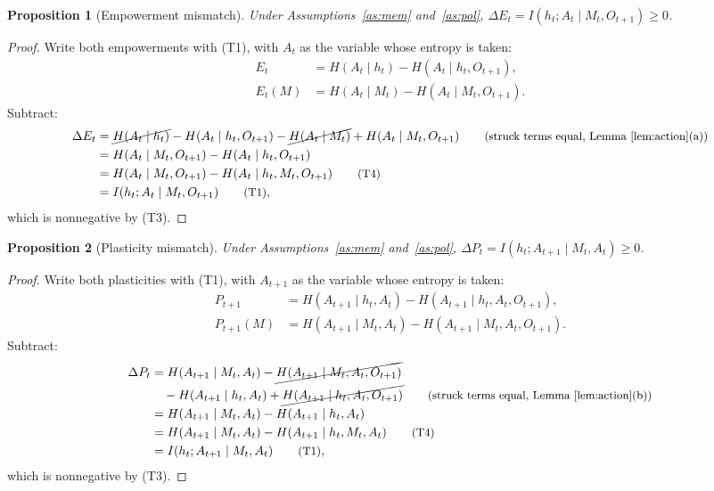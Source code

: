 \documentclass{article}
\newtheorem{proposition}{Proposition}[section]
\theoremstyle{definition}
\theoremstyle{remark}
\newcommand{\dE}{\Delta E}
\newcommand{\dP}{\Delta P}
\newcommand{\why}[1]{\tag*{\small(#1)}}
\begin{document}
\begin{proposition}[Empowerment mismatch]\label{prop:dE}
Under Assumptions~\ref{as:mem} and~\ref{as:pol}, $\dE_t=I(h_t;A_t\mid M_t,O_{t+1})\ge0$.
\end{proposition}

\begin{proof}
Write both empowerments with (T1), with $A_t$ as the variable whose entropy is taken:
\begin{align*}
E_t&=H(A_t\mid h_t)-H(A_t\mid h_t,O_{t+1}),\\
E_t(M)&=H(A_t\mid M_t)-H(A_t\mid M_t,O_{t+1}).
\end{align*}
Subtract:
\begin{align*}
\dE_t&=\cancel{H(A_t\mid h_t)}-H(A_t\mid h_t,O_{t+1})-\cancel{H(A_t\mid M_t)}+H(A_t\mid M_t,O_{t+1}) \why{struck terms equal, Lemma~\ref{lem:action}(a)}\\
&=H(A_t\mid M_t,O_{t+1})-H(A_t\mid h_t,O_{t+1})\\
&=H(A_t\mid M_t,O_{t+1})-H(A_t\mid h_t,M_t,O_{t+1}) \why{T4}\\
&=I(h_t;A_t\mid M_t,O_{t+1}) \why{T1},
\end{align*}
which is nonnegative by (T3).
\end{proof}

\begin{proposition}[Plasticity mismatch]\label{prop:dP}
Under Assumptions~\ref{as:mem} and~\ref{as:pol}, $\dP_t=I(h_t;A_{t+1}\mid M_t,A_t)\ge0$.
\end{proposition}

\begin{proof}
Write both plasticities with (T1), with $A_{t+1}$ as the variable whose entropy is taken:
\begin{align*}
P_{t+1}&=H(A_{t+1}\mid h_t,A_t)-H(A_{t+1}\mid h_t,A_t,O_{t+1}),\\
P_{t+1}(M)&=H(A_{t+1}\mid M_t,A_t)-H(A_{t+1}\mid M_t,A_t,O_{t+1}).
\end{align*}
Subtract:
\begin{align*}
\dP_t&=H(A_{t+1}\mid M_t,A_t)-\cancel{H(A_{t+1}\mid M_t,A_t,O_{t+1})}\\
&\quad-H(A_{t+1}\mid h_t,A_t)+\cancel{H(A_{t+1}\mid h_t,A_t,O_{t+1})} \why{struck terms equal, Lemma~\ref{lem:action}(b)}\\
&=H(A_{t+1}\mid M_t,A_t)-H(A_{t+1}\mid h_t,A_t)\\
&=H(A_{t+1}\mid M_t,A_t)-H(A_{t+1}\mid h_t,M_t,A_t) \why{T4}\\
&=I(h_t;A_{t+1}\mid M_t,A_t) \why{T1},
\end{align*}
which is nonnegative by (T3).
\end{proof}
\end{document}
